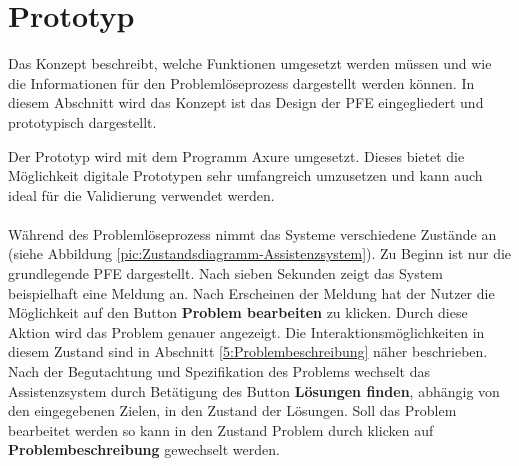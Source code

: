 \chapter{Prototyp}
\label{Prototyp}
Das Konzept beschreibt, welche Funktionen umgesetzt werden müssen und wie die Informationen für den Problemlöseprozess dargestellt werden können. In diesem Abschnitt wird das Konzept ist das Design der PFE eingegliedert und prototypisch dargestellt.

Der Prototyp wird mit dem Programm Axure  umgesetzt. Dieses bietet die Möglichkeit digitale Prototypen sehr umfangreich umzusetzen und kann auch ideal für die Validierung verwendet werden.
\\ \\
Während des Problemlöseprozess nimmt das Systeme verschiedene Zustände an (siehe Abbildung \ref{pic:Zustandsdiagramm-Assistenzsystem}). Zu Beginn ist nur die grundlegende PFE dargestellt. Nach sieben Sekunden zeigt das System beispielhaft eine Meldung an. Nach Erscheinen der Meldung hat der Nutzer die Möglichkeit auf den Button \textbf{Problem bearbeiten} zu klicken. Durch diese Aktion wird das Problem genauer angezeigt. Die Interaktionsmöglichkeiten in diesem Zustand sind in Abschnitt \ref{5:Problembeschreibung}  näher beschrieben. Nach der Begutachtung und Spezifikation des Problems wechselt das Assistenzsystem durch Betätigung des Button\textbf{ Lösungen finden}, abhängig von den eingegebenen Zielen, in den Zustand der Lösungen. Soll das Problem bearbeitet werden so kann in den Zustand Problem durch klicken auf \textbf{Problembeschreibung} gewechselt werden. 

